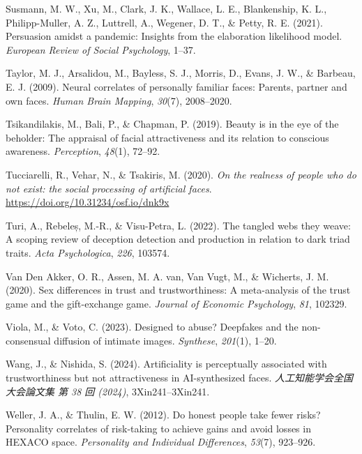 \documentclass[
  man,
  floatsintext,
  longtable,
  nolmodern,
  notxfonts,
  notimes,
  colorlinks=true,linkcolor=blue,citecolor=blue,urlcolor=blue]{apa7}
\newlength{\cslhangindent}
\newenvironment{CSLReferences}[2] %
 {\begin{list}{}{%
  \setlength{\itemindent}{0pt}
  \setlength{\leftmargin}{0pt}
  \setlength{\parsep}{0pt}
  \ifodd #1
   \setlength{\leftmargin}{\cslhangindent}
   \setlength{\itemindent}{-1\cslhangindent}
  \fi
  \setlength{\itemsep}{#2\baselineskip}}}
 {\end{list}}
\begin{document}
\begin{CSLReferences}{1}{0}
Susmann, M. W., Xu, M., Clark, J. K., Wallace, L. E., Blankenship, K.
L., Philipp-Muller, A. Z., Luttrell, A., Wegener, D. T., \& Petty, R. E.
(2021). Persuasion amidst a pandemic: Insights from the elaboration
likelihood model. \emph{European Review of Social Psychology}, 1--37.

Taylor, M. J., Arsalidou, M., Bayless, S. J., Morris, D., Evans, J. W.,
\& Barbeau, E. J. (2009). Neural correlates of personally familiar
faces: Parents, partner and own faces. \emph{Human Brain Mapping},
\emph{30}(7), 2008--2020.

Tsikandilakis, M., Bali, P., \& Chapman, P. (2019). Beauty is in the eye
of the beholder: The appraisal of facial attractiveness and its relation
to conscious awareness. \emph{Perception}, \emph{48}(1), 72--92.

Tucciarelli, R., Vehar, N., \& Tsakiris, M. (2020). \emph{On the
realness of people who do not exist: the social processing of artificial
faces}. \url{https://doi.org/10.31234/osf.io/dnk9x}

Turi, A., Rebeleș, M.-R., \& Visu-Petra, L. (2022). The tangled webs
they weave: A scoping review of deception detection and production in
relation to dark triad traits. \emph{Acta Psychologica}, \emph{226},
103574.

Van Den Akker, O. R., Assen, M. A. van, Van Vugt, M., \& Wicherts, J. M.
(2020). Sex differences in trust and trustworthiness: A meta-analysis of
the trust game and the gift-exchange game. \emph{Journal of Economic
Psychology}, \emph{81}, 102329.

Viola, M., \& Voto, C. (2023). Designed to abuse? Deepfakes and the
non-consensual diffusion of intimate images. \emph{Synthese},
\emph{201}(1), 1--20.

Wang, J., \& Nishida, S. (2024). Artificiality is perceptually
associated with trustworthiness but not attractiveness in AI-synthesized
faces. \emph{人工知能学会全国大会論文集 第 38 回 (2024)},
3Xin241--3Xin241.

Weller, J. A., \& Thulin, E. W. (2012). Do honest people take fewer
risks? Personality correlates of risk-taking to achieve gains and avoid
losses in HEXACO space. \emph{Personality and Individual Differences},
\emph{53}(7), 923--926.


\end{CSLReferences}
\end{document}
